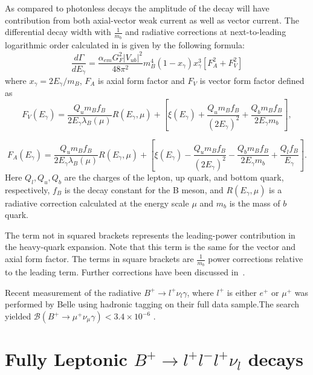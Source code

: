 As compared to photonless decays the amplitude of the decay will have contribution from both axial-vector weak current as well as vector current.
The differential decay width with $\frac{1}{m_{b}}$ and radiative corrections
at next-to-leading logarithmic order calculated in\cite{Beneke:2011nf} is given by the following formula:
\begin{equation}
\frac{d\Gamma}{dE_{\gamma}} = \frac{\alpha_{em}G^{2}_{F}|V_{ub}|^{2}}{48 \pi^{2}}m_{B}^{4}(1 - x_{\gamma})x_{\gamma}^{3}[F_A^{2} + F_V^{2}]
\end{equation}
 where $x_{\gamma} = 2E_{\gamma}/m_{B}$, $F_A$ is axial form factor and $F_V$  is vector form factor defined as
\begin{equation}
F_{V}(E_{\gamma}) = \frac{Q_{u}m_{B}f_{B}}{2E_{\gamma}\lambda_{B}(\mu)} R(E_{\gamma}, \mu) + [\xi(E_\gamma) +  \frac{Q_{u}m_{B}f_{B}}{(2E_{\gamma})^{2}} + \frac{Q_{b}m_{B}f_{B}}{2E_{\gamma}m_{b}}],
\end{equation}

\begin{equation}
F_{A}(E_{\gamma}) = \frac{Q_{u}m_{B}f_{B}}{2E_{\gamma}\lambda_{B}(\mu)} R(E_{\gamma}, \mu) + [\xi(E_\gamma) -  \frac{Q_{u}m_{B}f_{B}}{(2E_{\gamma})^{2}} - \frac{Q_{b}m_{B}f_{B}}{2E_{\gamma}m_{b}} + \frac{Q_{l}f_{B}}{E_{\gamma}}].
\end{equation}
Here $Q_{l},Q_{u},Q_{b}$ are the charges of the lepton, up quark, and
bottom quark, respectively, $f_{B}$ is the decay constant for
the B meson, and $R(E_{\gamma}, \mu)$ is a radiative correction
calculated at the energy scale $\mu$ %
and $m_{b}$ is the mass of $b$ quark.

The term not in squared brackets represents the leading-power contribution in the heavy-quark expansion. Note that this term
is the same for the vector and axial form factor. The terms in square brackets are $\frac{1}{m_{b}}$ power corrections relative to the leading term. Further corrections have been discussed in~\cite{Wang:2016beq}.



Recent measurement of the radiative $B^{+} \rightarrow l^{+} \nu_{l} \gamma$, where $l^{+}$ is either $e^{+}$ or $\mu^{+}$ was performed by Belle using hadronic tagging on their full data sample\cite{Heller:2015vvm}.The search yielded $\mathcal{B}(B^{+}\rightarrow \mu^{+} \nu_\mu \gamma) < 3.4\times 10^{-6}$ \cite{Heller:2015vvm}.



\section{Fully Leptonic $B^{+}\rightarrow l^{+} l^{-} l^{+} \nu_{l} $ decays}


